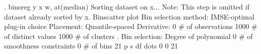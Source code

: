 . binsreg y x w, at(median)
Sorting dataset on x...
Note: This step is omitted if dataset already sorted by x.
{\smallskip}
Binscatter plot
Bin selection method: IMSE-optimal plug-in choice
Placement: Quantile-spaced
Derivative: 0
{\smallskip}
\# of observations             {\VBAR}    1000
\# of distinct values          {\VBAR}    1000
\# of clusters                 {\VBAR}       .
Bin selection:                {\VBAR} 
         Degree of polynomial {\VBAR}       0
  \# of smoothness constraints {\VBAR}       0
                    \# of bins {\VBAR}      21
{\smallskip}
         {\VBAR}      p       s       df
 dots    {\VBAR}      0       0       21
